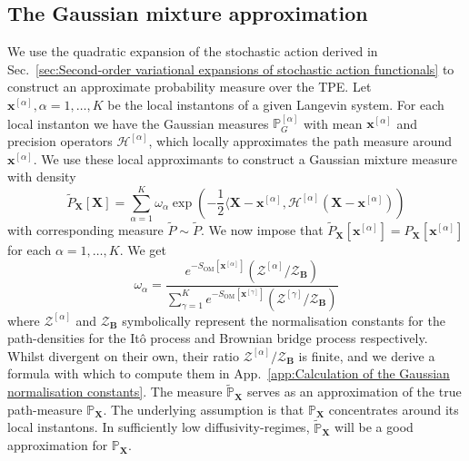 \subsection{The Gaussian mixture approximation} \label{sec:The Gaussian mixture approximation}

We use the quadratic expansion of the stochastic action derived in Sec.~\ref{sec:Second-order variational expansions of stochastic action functionals} to construct an approximate probability measure over the TPE. Let $\mathbf{x}^{[\alpha]},\alpha=1,\dots,K$ be the local instantons of a given Langevin system. For each local instanton we have the Gaussian measures $\mathbb{P}_G^{[\alpha]}$ with mean $\mathbf{x}^{[\alpha]}$ and precision operators $\mathcal{H}^{[\alpha]}$, which locally approximates the path measure around $\mathbf{x}^{[\alpha]}$. We use these local approximants to construct a Gaussian mixture measure with density
\begin{equation} \label{eq:gaussian mixture approx of TPE}
	\tilde{P}_\mathbf{X}[\mathbf{X}] = \sum_{\alpha=1}^K \omega_\alpha \exp \left( - \frac{1}{2} \langle \mathbf{X} - \mathbf{x}^{[\alpha]}, \mathcal{H}^{[\alpha]} (\mathbf{X} - \mathbf{x}^{[\alpha]}) \right)
\end{equation}
with corresponding measure $\tilde{P} \sim \tilde{P}$. We now impose that $\tilde{P}_\mathbf{X}[\mathbf{x}^{[\alpha]}] = P_\mathbf{X}[\mathbf{x}^{[\alpha]}]$ for each $\alpha = 1,\dots,K$. We get
\begin{equation} \label{eq:gaussian mixture approx weights}
	\omega_\alpha = \frac{e^{-S_{\text{OM}}[\mathbf{x}^{[\alpha]}]} (\mathcal{Z}^{[\alpha]} / \mathcal{Z}_\mathbf{B}) }{ \sum_{\gamma=1}^{K}e^{-S_{\text{OM}}[\mathbf{x}^{[\gamma]}]}(\mathcal{Z}^{[\gamma]} / \mathcal{Z}_\mathbf{B}) }
\end{equation}
where $\mathcal{Z}^{[\alpha]}$ and $\mathcal{Z}_\mathbf{B}$ symbolically represent the normalisation constants for the path-densities for the It\^{o} process and Brownian bridge process respectively. Whilst divergent on their own, their ratio $\mathcal{Z}^{[\alpha]} / \mathcal{Z}_\mathbf{B}$ is finite, and we derive a formula with which to compute them in App.~\ref{app:Calculation of the Gaussian normalisation constants}. The measure $\tilde{\mathbb{P}}_\mathbf{X}$ serves as an approximation of the true path-measure $\mathbb{P}_\mathbf{X}$. The underlying assumption is that $\mathbb{P}_\mathbf{X}$ concentrates around its local instantons. In sufficiently low diffusivity-regimes, $\tilde{\mathbb{P}}_\mathbf{X}$ will be a good approximation for $\mathbb{P}_\mathbf{X}$.


